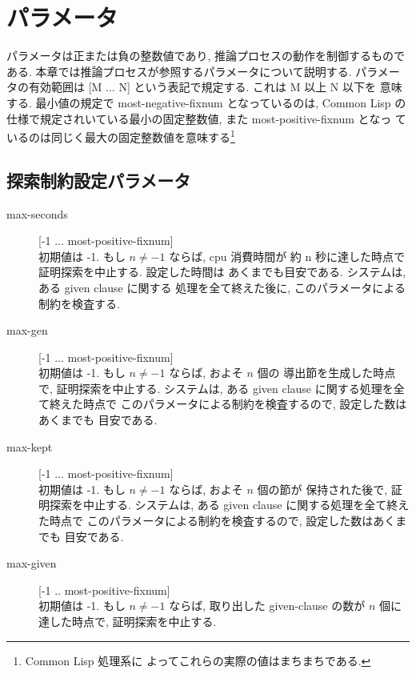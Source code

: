 \section{パラメータ}
\label{sec:option-parameters}

パラメータは正または負の整数値であり, 推論プロセスの動作を制御するものである.
本章では推論プロセスが参照するパラメータについて説明する.
パラメータの有効範囲は [M ... N] という表記で規定する. これは M 以上 N 以下を
意味する. 最小値の規定で most-negative-fixnum となっているのは, Common Lisp 
の仕様で規定されいている最小の固定整数値, また most-positive-fixnum となっ
ているのは同じく最大の固定整数値を意味する\footnote{Common Lisp 処理系に
  よってこれらの実際の値はまちまちである. }

\subsection{探索制約設定パラメータ}

\begin{description}
\item[max-seconds] [-1 ... most-positive-fixnum]\\
  初期値は -1. もし $n\neq -1$ ならば, cpu 消費時間が
  約 n 秒に達した時点で証明探索を中止する. 設定した時間は
  あくまでも目安である. システムは, ある given clause に関する
  処理を全て終えた後に, このパラメータによる制約を検査する.

\item[max-gen] [-1 ... most-positive-fixnum]\\
  初期値は -1. もし $n\neq -1$ ならば, およそ $n$ 個の
  導出節を生成した時点で, 証明探索を中止する. 
  システムは, ある given clause に関する処理を全て終えた時点で
  このパラメータによる制約を検査するので, 設定した数はあくまでも
  目安である. 

\item[max-kept] [-1 ... most-positive-fixnum]\\
  初期値は -1. もし $n\neq -1$ ならば, およそ $n$ 個の節が
  保持された後で, 証明探索を中止する. 
  システムは, ある given clause に関する処理を全て終えた時点で
  このパラメータによる制約を検査するので, 設定した数はあくまでも
  目安である.

\item[max-given] [-1 .. most-positive-fixnum] \\
  初期値は -1. もし $n\neq -1$ ならば, 取り出した given-clause の数が 
  $n$ 個に達した時点で, 証明探索を中止する.

\end{description}

